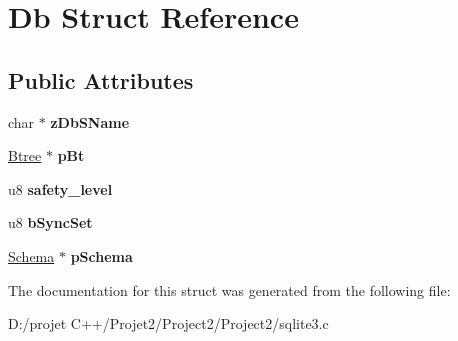 \hypertarget{struct_db}{}\section{Db Struct Reference}
\label{struct_db}
\subsection*{Public Attributes}
\begin{DoxyCompactItemize}
\item 
\mbox{\label{struct_db_a3129038e85466e764d1c866af0c9b3a2}} 
char $\ast$ {\bfseries z\+Db\+S\+Name}
\item 
\mbox{\label{struct_db_a0633e5a6abfc39246d07cc6a417a5852}} 
\mbox{\hyperlink{struct_btree}{Btree}} $\ast$ {\bfseries p\+Bt}
\item 
\mbox{\label{struct_db_a04597a5c023d8b328193450b177ff24c}} 
u8 {\bfseries safety\+\_\+level}
\item 
\mbox{\label{struct_db_a37f3a8593c9d7042c1c26dd492c409e4}} 
u8 {\bfseries b\+Sync\+Set}
\item 
\mbox{\label{struct_db_afd8647a83a4a7053231b92814520d6d4}} 
\mbox{\hyperlink{struct_schema}{Schema}} $\ast$ {\bfseries p\+Schema}
\end{DoxyCompactItemize}


The documentation for this struct was generated from the following file\+:\begin{DoxyCompactItemize}
\item 
D\+:/projet C++/\+Projet2/\+Project2/\+Project2/sqlite3.\+c\end{DoxyCompactItemize}
